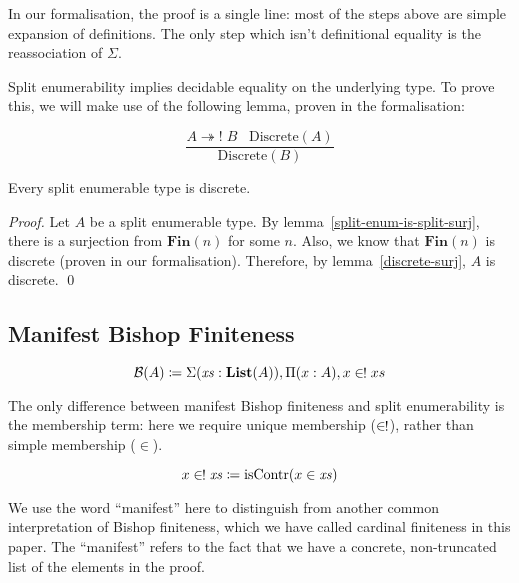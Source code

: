 In our formalisation, the proof is a single line: most of the steps above are
simple expansion of definitions.
The only step which isn't definitional equality is the reassociation of
\(\Sigma\).

Split enumerability implies decidable equality on the underlying type.
To prove this, we will make use of the following lemma, proven in the
formalisation:
\begin{romlemma} \label{discrete-surj}
  \begin{equation}
    \frac{
        A \twoheadrightarrow! \; B \; \; \; \text{Discrete}(A)
      }{
       \text{Discrete}(B) 
      }
  \end{equation}
\end{romlemma}
\begin{romlemma} \label{split-enum-discrete}
  Every split enumerable type is discrete.
\end{romlemma}
\begin{proof}
  Let \(A\) be a split enumerable type.
  By lemma~\ref{split-enum-is-split-surj}, there is a surjection from
  \(\mathbf{Fin}(n)\) for some \(n\).
  Also, we know that \(\mathbf{Fin}(n)\) is discrete (proven in our
  formalisation).
  Therefore, by lemma~\ref{discrete-surj}, \(A\) is discrete.
  \qed
\end{proof}
\subsection{Manifest Bishop Finiteness}
\begin{romdefinition}
  \begin{equation} \label{bish-def}
    \mathcal{B}(A) \coloneqq \Sigma {(\mathit{xs} : \textbf{List}(A))} , \Pi {(x : A)} , x \inunique xs
  \end{equation}
\end{romdefinition}
The only difference between manifest Bishop finiteness and split enumerability
is the membership term: here we require unique membership (\(\inunique\)),
rather than simple membership (\(\in\)).
\begin{romdefinition} \label{uniq-memb-def}
  \begin{equation}
    x \inunique \mathit{xs} \coloneqq \text{isContr}(x \in \mathit{xs})
  \end{equation}
\end{romdefinition}

We use the word ``manifest'' here to distinguish from another common
interpretation of Bishop finiteness, which we have called cardinal finiteness in
this paper.
The ``manifest'' refers to the fact that we have a concrete, non-truncated list
of the elements in the proof.

